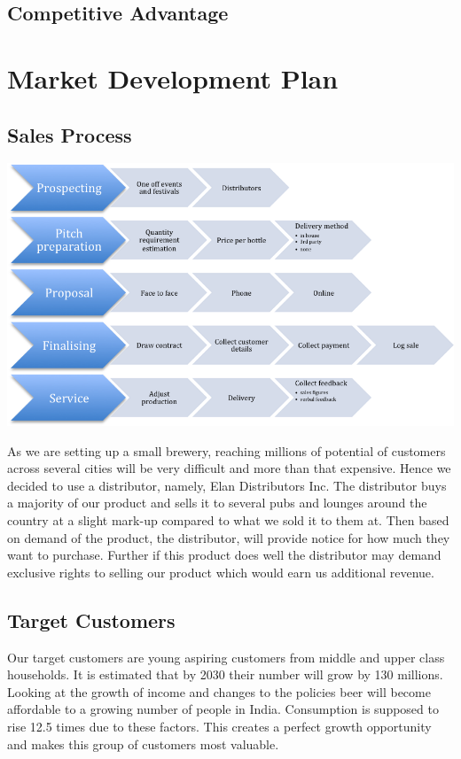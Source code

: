 \documentclass[11pt]{article}
\begin{document}
  \subsection{Competitive Advantage}

\newpage
\section{Market Development Plan}
  \subsection{Sales Process}
  \includegraphics[width=\textwidth,keepaspectratio]{./process.png}

As we are setting up a small brewery, reaching millions of potential of customers across several cities will be very difficult and more than that expensive. Hence we decided to use a distributor, namely, Elan Distributors Inc. The distributor buys a majority of our product and sells it to several pubs and lounges around the country at a slight mark-up compared to what we sold it to them at. Then based on demand of the product, the distributor, will provide notice for how much they want to purchase. Further if this product does well the distributor may demand exclusive rights to selling our product which would earn us additional revenue.

  \subsection{Target Customers}
  Our target customers are young aspiring customers from middle and upper class households.
  It is estimated that by 2030 their number will grow by 130 millions.
  Looking at the growth of income and changes to the policies beer will become affordable to a growing number of people in India.
  Consumption is supposed to rise 12.5 times due to these factors.
  This creates a perfect growth opportunity and makes this group of customers most valuable.
\end{document}
